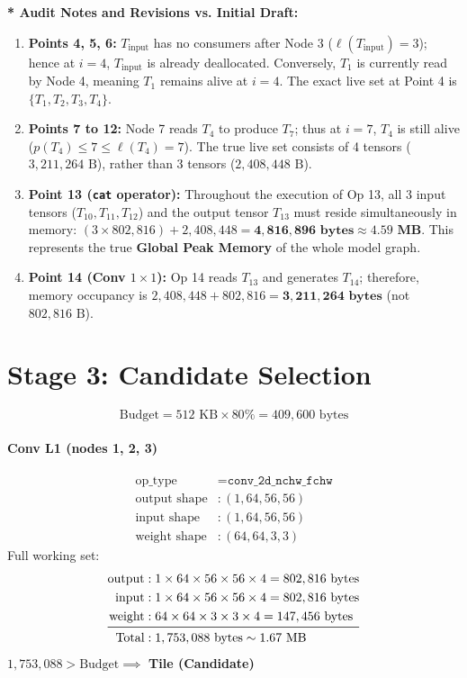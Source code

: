 \documentclass[11pt,a4paper]{article}
\begin{document}
\textbf{\textcolor{highlightblue}{* Audit Notes and Revisions vs. Initial Draft:}}
\begin{enumerate}
    \item \textbf{Points 4, 5, 6:} $T_{\text{input}}$ has no consumers after Node 3 ($\ell(T_{\text{input}}) = 3$); hence at $i=4$, $T_{\text{input}}$ is already deallocated. Conversely, $T_1$ is currently read by Node 4, meaning $T_1$ remains alive at $i=4$. The exact live set at Point 4 is $\{T_1, T_2, T_3, T_4\}$.
    \item \textbf{Points 7 to 12:} Node 7 reads $T_4$ to produce $T_7$; thus at $i=7$, $T_4$ is still alive ($p(T_4)\le 7 \le \ell(T_4)=7$). The true live set consists of 4 tensors ($3,211,264\text{ B}$), rather than 3 tensors ($2,408,448\text{ B}$).
    \item \textbf{Point 13 (\texttt{cat} operator):} Throughout the execution of Op 13, all 3 input tensors ($T_{10}, T_{11}, T_{12}$) and the output tensor $T_{13}$ must reside simultaneously in memory: $(3 \times 802,816) + 2,408,448 = \mathbf{4,816,896\text{ bytes}} \approx \mathbf{4.59\text{ MB}}$. This represents the true \textbf{Global Peak Memory} of the whole model graph.
    \item \textbf{Point 14 (Conv $1\times 1$):} Op 14 reads $T_{13}$ and generates $T_{14}$; therefore, memory occupancy is $2,408,448 + 802,816 = \mathbf{3,211,264\text{ bytes}}$ (not $802,816\text{ B}$).
\end{enumerate}

\section{Stage 3: Candidate Selection}

$$\text{Budget} = 512\text{ KB} \times 80\% = 409,600\text{ bytes}$$

\paragraph{Conv L1 (nodes 1, 2, 3)}
\begin{align*}
\text{op\_type} &= \texttt{conv\_2d\_nchw\_fchw} \\
\text{output shape} &: (1, 64, 56, 56) \\
\text{input shape} &: (1, 64, 56, 56) \\
\text{weight shape} &: (64, 64, 3, 3)
\end{align*}
Full working set:
\begin{align*}
\text{output} &: 1 \times 64 \times 56 \times 56 \times 4 = 802,816\text{ bytes} \\
\text{input} &: 1 \times 64 \times 56 \times 56 \times 4 = 802,816\text{ bytes} \\
\text{weight} &: 64 \times 64 \times 3 \times 3 \times 4 = 147,456\text{ bytes} \\
\midrule
\text{Total} &: 1,753,088\text{ bytes} \sim 1.67\text{ MB}
\end{align*}
$1,753,088 > \text{Budget} \implies$ \textbf{Tile (Candidate)}
\end{document}
